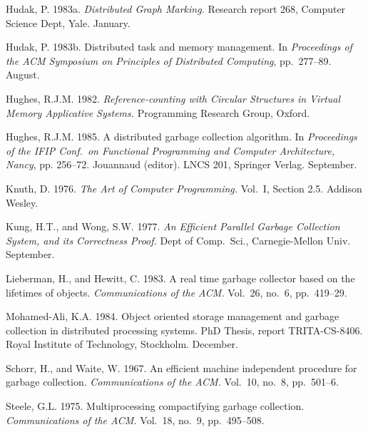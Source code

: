 \begin{references}
        \item Hudak, P. 1983a. \textit{Distributed Graph Marking.} Research report 268, Computer Science
        Dept, Yale. January.

        \item Hudak, P. 1983b. Distributed task and memory management. In \textit{Proceedings of the
            ACM Symposium on Principles of Distributed Computing}, pp.~277--89. August.

        \item Hughes, R.J.M. 1982. \textit{Reference-counting with Circular Structures in Virtual Memory
            Applicative Systems.} Programming Research Group, Oxford.

        \item Hughes, R.J.M. 1985. A distributed garbage collection algorithm. In \textit{Proceedings of the
            IFIP Conf.\ on Functional Programming and Computer Architecture, Nancy}, pp.
        256--72. Jouannaud (editor). LNCS 201, Springer Verlag. September.

        \item Knuth, D. 1976. \textit{The Art of Computer Programming.} Vol.~I, Section 2.5. Addison
        Wesley.

        \item Kung, H.T., and Wong, S.W. 1977. \textit{An Efficient Parallel Garbage Collection System,
            and its Correctness Proof.} Dept of Comp.\ Sci., Carnegie-Mellon Univ.
        September.

        \item Lieberman, H., and Hewitt, C. 1983. A real time garbage collector based on the
        lifetimes of objects. \textit{Communications of the ACM.} Vol.~26, no.~6, pp.~419--29.

        \item Mohamed-Ali, K.A. 1984. Object oriented storage management and garbage
        collection in distributed processing systems. PhD Thesis, report TRITA-CS-8406.
        Royal Institute of Technology, Stockholm. December.

        \item Schorr, H., and Waite, W. 1967. An efficient machine independent procedure for
        garbage collection. \textit{Communications of the ACM.} Vol.~10, no.~8, pp.~501--6.

        \item Steele, G.L. 1975. Multiprocessing compactifying garbage collection. \textit{Communications of the ACM.} Vol.~18, no.~9, pp.~495--508.


\end{references}
